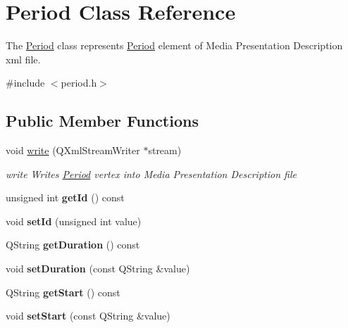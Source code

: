 \hypertarget{class_period}{\section{Period Class Reference}
\label{class_period}
}


The \hyperlink{class_period}{Period} class represents \hyperlink{class_period}{Period} element of Media Presentation Description xml file.  




{\ttfamily \#include $<$period.\-h$>$}

\subsection*{Public Member Functions}
\begin{DoxyCompactItemize}
\item 
void \hyperlink{class_period_afa22d2b626be153a49ae9194f6027676}{write} (Q\-Xml\-Stream\-Writer $\ast$stream)
\begin{DoxyCompactList}\small\item\em write Writes \hyperlink{class_period}{Period} vertex into Media Presentation Description file \end{DoxyCompactList}\item 
\hypertarget{class_period_a8e7139a1e32f58faca736d4162998035}{unsigned int {\bfseries get\-Id} () const }\label{class_period_a8e7139a1e32f58faca736d4162998035}

\item 
\hypertarget{class_period_ae13d617aa1a99d6aabfe33bb3dff5ead}{void {\bfseries set\-Id} (unsigned int value)}\label{class_period_ae13d617aa1a99d6aabfe33bb3dff5ead}

\item 
\hypertarget{class_period_a842f7763b3ee02b3196808d7434e83d2}{Q\-String {\bfseries get\-Duration} () const }\label{class_period_a842f7763b3ee02b3196808d7434e83d2}

\item 
\hypertarget{class_period_a8df6ac7816e627e71561dff34475df5d}{void {\bfseries set\-Duration} (const Q\-String \&value)}\label{class_period_a8df6ac7816e627e71561dff34475df5d}

\item 
\hypertarget{class_period_a175391b527970b3ccc3a14c1a7d5fd8f}{Q\-String {\bfseries get\-Start} () const }\label{class_period_a175391b527970b3ccc3a14c1a7d5fd8f}

\item 
\hypertarget{class_period_a7740fb9322048f6def916cae7cbbd5e2}{void {\bfseries set\-Start} (const Q\-String \&value)}\label{class_period_a7740fb9322048f6def916cae7cbbd5e2}


\end{DoxyCompactItemize}
